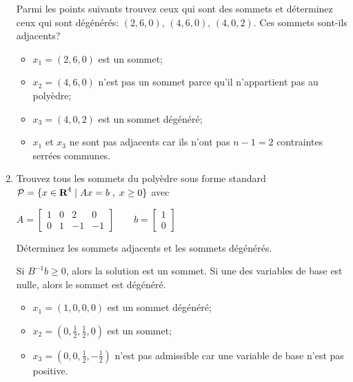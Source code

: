 \begin{enumerate}
    Parmi les points suivants trouvez ceux qui sont des sommets et déterminez ceux qui sont
    dégénérés: $(2, 6, 0)$, $(4, 6, 0)$, $(4, 0, 2)$. Ces sommets sont-ils adjacents?





    \begin{solution}
      \begin{itemize}
        \item $x_{1} = (2,6,0) $ est un sommet;
        \item $x_{2} = (4,6,0) $ n'est pas un sommet parce
          qu'il n'appartient pas au polyèdre;
        \item $x_{3} = (4,0,2) $ est un sommet dégénéré;
        \item $x_{1}$ et  $x_{3}$ ne sont pas adjacents
          car ils n'ont pas $n-1=2$ contraintes serrées communes.
      \end{itemize}
    \end{solution}

  \item Trouvez  tous les sommets du poly\`edre sous forme standard ${\mathcal{P}}=\{x \in {\mbox{\bf R}}^4 \; | \; Ax=b \; , \; x \geq 0\}$ avec

    $
    A=
    \left[ \begin{array}{rrrr}
        1 & 0 & 2 & 0\\
        0 & 1 & -1 & -1
      \end{array}
    \right]
    \qquad
    b=
    \left[ \begin{array}{r}
        1 \\
        0
      \end{array}
    \right]$


    Déterminez les sommets adjacents et les sommets dégénérés.


    \begin{solution}
      Si $B^{-1}b \geq 0$, alors la solution est un sommet.
      Si une des variables de base est nulle, alors le sommet est dégénéré.
      \begin{itemize}
        \item $x_{1} = (1,0,0,0)$ est un sommet dégénéré;
        \item $x_{2} = (0,\frac{1}{2},\frac{1}{2},0)$ est un sommet;
        \item $x_{3} = (0,0,\frac{1}{2},-\frac{1}{2})$ n'est pas admissible
          car une variable de base n'est pas positive.
      \end{itemize}
    \end{solution}


\end{enumerate}
